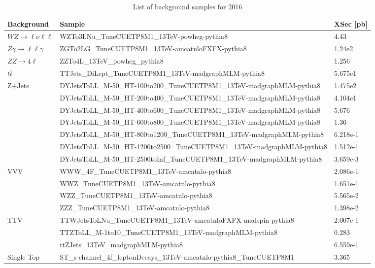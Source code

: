 \begin{sidewaystable}[htb]
\begin{center}
\caption{List of background samples for 2016}
\footnotesize
\begin{tabular}{|l|l|l|}
\hline
Background  & Sample & XSec [pb] \\ \hline
\hline $WZ\rightarrow\ell\nu\ell\ell$
&WZTo3LNu\_TuneCUETP8M1\_13TeV-powheg-pythia8  & 4.43 \\
\hline $Z\gamma\rightarrow\ell\ell\gamma$
&ZGTo2LG\_TuneCUETP8M1\_13TeV-amcatnloFXFX-pythia8 & 1.24e2 \\
\hline $ZZ\rightarrow4\ell$
&ZZTo4L\_13TeV\_powheg\_pythia8 & 1.256 \\
\hline $t\bar{t}$
&TTJets\_DiLept\_TuneCUETP8M1\_13TeV-madgraphMLM-pythia8 & 5.675e1 \\
\hline Z+Jets
& DYJetsToLL\_M-50\_HT-100to200\_TuneCUETP8M1\_13TeV-madgraphMLM-pythia8   & 1.475e2 \\
& DYJetsToLL\_M-50\_HT-200to400\_TuneCUETP8M1\_13TeV-madgraphMLM-pythia8   & 4.104e1 \\
& DYJetsToLL\_M-50\_HT-400to600\_TuneCUETP8M1\_13TeV-madgraphMLM-pythia8   & 5.676   \\
& DYJetsToLL\_M-50\_HT-600to800\_TuneCUETP8M1\_13TeV-madgraphMLM-pythia8   & 1.36    \\
& DYJetsToLL\_M-50\_HT-800to1200\_TuneCUETP8M1\_13TeV-madgraphMLM-pythia8  & 6.218e-1\\
& DYJetsToLL\_M-50\_HT-1200to2500\_TuneCUETP8M1\_13TeV-madgraphMLM-pythia8 & 1.512e-1\\
& DYJetsToLL\_M-50\_HT-2500toInf\_TuneCUETP8M1\_13TeV-madgraphMLM-pythia8  & 3.659e-3\\
\hline VVV
&WWW\_4F\_TuneCUETP8M1\_13TeV-amcatnlo-pythia8 & 2.086e-1 \\
&WWZ\_TuneCUETP8M1\_13TeV-amcatnlo-pythia8     & 1.651e-1 \\
&WZZ\_TuneCUETP8M1\_13TeV-amcatnlo-pythia8     & 5.565e-2 \\
&ZZZ\_TuneCUETP8M1\_13TeV-amcatnlo-pythia8     & 1.398e-2 \\
\hline TTV
&TTWJetsToLNu\_TuneCUETP8M1\_13TeV-amcatnloFXFX-madspin-pythia8 & 2.007e-1 \\
&TTZToLL\_M-1to10\_TuneCUETP8M1\_13TeV-madgraphMLM-pythia8      & 0.283    \\
&ttZJets\_13TeV\_madgraphMLM-pythia8                            & 6.559e-1 \\
\hline Single Top
&ST\_s-channel\_4f\_leptonDecays\_13TeV-amcatnlo-pythia8\_TuneCUETP8M1                      & 3.365   \\

\end{tabular}
\end{center}
\end{sidewaystable}
